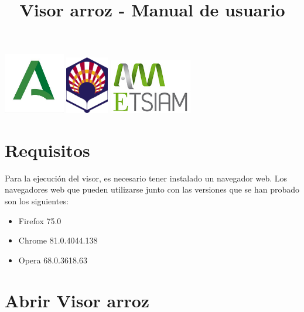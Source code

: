 \documentclass{article}
\title{Visor arroz - Manual de usuario}
\begin{document}
\maketitle

\begin{center}
	\includegraphics[width=0.2\textwidth]{andalucia.jpg}
	\hspace{1cm}
	\centering
	\includegraphics[width=0.14\textwidth]{Logo_UCO.png}
	\hspace{1cm}
	\centering
	\includegraphics[width=0.27\textwidth]{etsiam.jpg}
\end{center}

\newpage

\tableofcontents

\listoffigures

\newpage

\section{Requisitos}

Para la ejecución del visor, es necesario tener instalado un navegador web. Los navegadores web que pueden utilizarse junto con las versiones que se han probado son los siguientes:

\begin{itemize}
	\item Firefox 75.0
	\item Chrome 81.0.4044.138
	\item Opera 68.0.3618.63
\end{itemize}

\section{Abrir Visor arroz}
\end{document}
